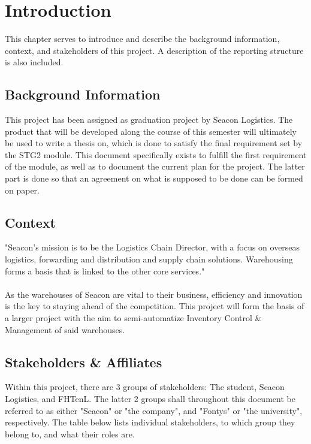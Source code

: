 \chapter{Introduction}
\label{ch:introduction}

This chapter serves to introduce and describe the background information, context, and stakeholders of this project. A description of the reporting structure is also included.

\section{Background Information}
\label{sec:background}
This project has been assigned as graduation project by Seacon Logistics. The product that will be developed along the course of this semester will ultimately be used to write a thesis on, which is done to satisfy the final requirement set by the \gls{STG2} module. This document specifically exists to fulfill the first requirement of the module, as well as to document the current plan for the project. The latter part is done so that an agreement on what is supposed to be done can be formed on paper.

\section{Context}
\label{sec:context}
"Seacon's mission is to be the Logistics Chain Director, with a focus on overseas logistics, forwarding and distribution and supply chain solutions. Warehousing forms a basis that is linked to the other core services." \cite{About_Seacon} \\\\
\noindent
As the warehouses of Seacon are vital to their business, efficiency and innovation is the key to staying ahead of the competition. This project will form the basis of a larger project with the aim to semi-automatize Inventory Control \& Management of said warehouses.

\section{Stakeholders \& Affiliates}
Within this project, there are 3 groups of stakeholders: The student, Seacon Logistics, and \gls{FHTenL}. The latter 2 groups shall throughout this document be referred to as either "Seacon" or "the company", and "Fontys" or "the university", respectively. The table below lists individual stakeholders, to which group they belong to, and what their roles are.

